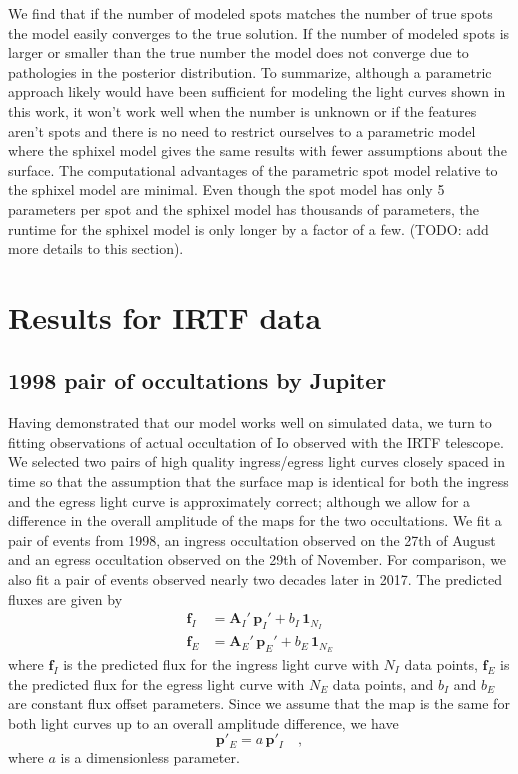 \documentclass[modern]{aastex62}
\begin{document}
We find that if the number of modeled spots matches the number of true spots the model easily converges to the true solution. 
If the number of modeled spots is larger or smaller than the true number the model does not converge due to pathologies in the posterior distribution.
To summarize, although a parametric approach likely would have been sufficient for modeling the light curves shown in this work, it won't work well when the number is unknown or if the features aren't spots and there is no need to restrict ourselves to a parametric model where the sphixel model gives the same results with fewer assumptions about the surface. 
The computational advantages of the parametric spot model relative to the sphixel model are minimal. 
Even though the spot model has only 5 parameters per spot and the sphixel model has thousands of parameters, the runtime for the sphixel model is only longer by a factor of a few. (TODO: add more details to this section).

\section{Results for IRTF data}
\label{sec:results}
\subsection{1998 pair of occultations by Jupiter}
Having demonstrated that our model works well on simulated data, we turn to fitting observations of actual occultation of Io observed with the IRTF telescope.
We selected two pairs of high quality ingress/egress light curves closely spaced in time so that the assumption that the surface map is identical for both the ingress and the egress light curve is approximately correct; although we allow for a difference in the overall amplitude of the maps for the two occultations.
We fit a pair of events from 1998, an ingress occultation observed on the 27th of August and an egress occultation observed on the 29th of November.
For comparison, we also fit a pair of events observed nearly two decades later in 2017.
The predicted fluxes are given by 
\begin{align}
    \mathbf{f}_I&=\mathbf{A}_I'\,\mathbf{p}_I' +b_I\,\mathbf{1}_{N_I}\\
    \mathbf{f}_E&=\mathbf{A}_E'\,\mathbf{p}_E' +b_E\,\mathbf{1}_{N_E}
\end{align}
where $\mathbf{f}_I$ is the predicted flux for the ingress light curve with $N_I$ data points, $\mathbf{f}_E$ is the predicted flux for the egress light curve with $N_E$ data points, and $b_I$ and $b_E$ are constant flux offset parameters.
Since we assume that the map is the same for both light curves up to an overall amplitude difference, we have
\begin{equation}
    \mathbf{p}'_E=a\,\mathbf{p}'_I
    \quad,
\end{equation}
where $a$ is a dimensionless parameter.
\end{document}
